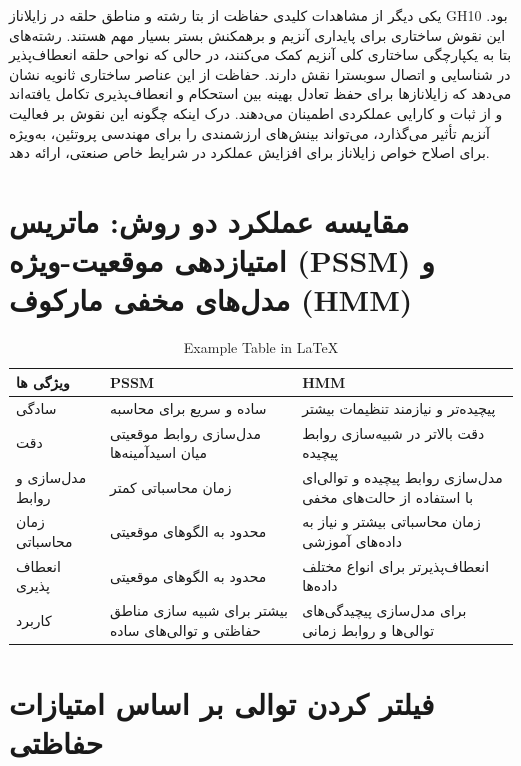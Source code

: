                 یکی دیگر از مشاهدات کلیدی حفاظت از بتا رشته و مناطق حلقه در زایلاناز GH10 بود. این نقوش ساختاری برای پایداری آنزیم و برهمکنش بستر بسیار مهم هستند. رشته‌های بتا به یکپارچگی ساختاری کلی آنزیم کمک می‌کنند، در حالی که نواحی حلقه انعطاف‌پذیر در شناسایی و اتصال سوبسترا نقش دارند. حفاظت از این عناصر ساختاری ثانویه نشان می‌دهد که زایلانازها برای حفظ تعادل بهینه بین استحکام و انعطاف‌پذیری تکامل یافته‌اند و از ثبات و کارایی عملکردی اطمینان می‌دهند. درک اینکه چگونه این نقوش بر فعالیت آنزیم تأثیر می‌گذارد، می‌تواند بینش‌های ارزشمندی را برای مهندسی پروتئین، به‌ویژه برای اصلاح خواص زایلاناز برای افزایش عملکرد در شرایط خاص صنعتی، ارائه دهد.
        \section*{مقایسه عملکرد دو روش: ماتریس امتیازدهی موقعیت-ویژه (PSSM) و مدل‌های مخفی مارکوف (HMM)}
            \begin{table}[H]
                \centering
                \begin{tabular}{|p{1cm}|p{4cm}|p{5cm}|}
                    \hline
                    ويژگی ها & PSSM & HMM \\
                    \hline
                    سادگی & ساده و سریع برای محاسبه & پیچیده‌تر و نیازمند تنظیمات بیشتر \\
                    \hline
                    دقت & مدل‌سازی روابط موقعیتی میان اسیدآمینه‌ها & دقت بالاتر در شبیه‌سازی روابط پیچیده \\
                    \hline
                    مدل‌سازی و روابط & زمان محاسباتی کمتر & مدل‌سازی روابط پیچیده و توالی‌ای با استفاده از حالت‌های مخفی \\
                    \hline
                    زمان محاسباتی & محدود به الگوهای موقعیتی & زمان محاسباتی بیشتر و نیاز به داده‌های آموزشی \\
                    \hline
                    انعطاف پذیری & محدود به الگوهای موقعیتی & انعطاف‌پذیرتر برای انواع مختلف داده‌ها \\
                    \hline
                    کاربرد & بیشتر برای شبیه سازی مناطق حفاظتی و توالی‌های ساده & برای مدل‌سازی پیچیدگی‌های توالی‌ها و روابط زمانی \\
                    \hline
                \end{tabular}
                \caption{Example Table in LaTeX}
                \label{tab:example}
            \end{table}

        \section{فیلتر کردن توالی بر اساس امتیازات حفاظتی}
